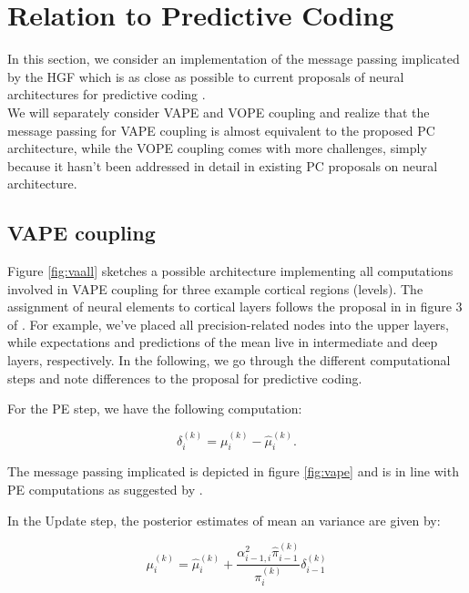 \section{Relation to Predictive Coding}

In this section, we consider an implementation of the message passing implicated by the HGF which is as close as possible to current proposals of neural architectures for predictive coding \cite{Shipp2016}.\\

We will separately consider \textsf{VAPE} and \textsf{VOPE} coupling and realize that the message passing for \textsf{VAPE} coupling is almost equivalent to the proposed PC architecture, while the \textsf{VOPE} coupling comes with more challenges, simply because it hasn't been addressed in detail in existing PC proposals on neural architecture.


\subsection{VAPE coupling}

Figure \ref{fig:vaall} sketches a possible architecture implementing all computations involved in \textsf{VAPE} coupling for three example cortical regions (levels). The assignment of neural elements to cortical layers follows the proposal in in figure 3 of \cite{Shipp2016}. For example, we've placed all precision-related nodes into the upper layers, while expectations and predictions of the mean live in intermediate and deep layers, respectively. In the following, we go through the different computational steps and note differences to the proposal for predictive coding.

For the \textsf{PE} step, we have the following computation:

\begin{equation}
	\delta_i^{(k)} = \mu_i^{(k)} - \hat{\mu}_i^{(k)}.
\end{equation}


The message passing implicated is depicted in figure \ref{fig:vape} and is in line with PE computations as suggested by \cite{Shipp2016}.

In the \textsf{Update} step, the posterior estimates of mean an variance are given by:

\begin{equation}
	\mu_i^{(k)} = \hat{\mu}_i^{(k)} + \frac{\alpha_{i-1,i}^2 \hat{\pi}_{i-1}^{(k)}}{\pi_i^{(k)}} \delta_{i-1}^{(k)}
\end{equation}

